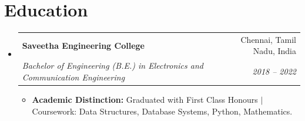 \documentclass[letterpaper,10pt]{article}
\makeatletter
\newcommand{\resumeItem}[1]{
  \item\small{
    {#1 \vspace{-2.5pt}}
  }
}
\newcommand{\resumeSubheading}[4]{
  \vspace{-2pt}\item
    \begin{tabular*}{1.0\textwidth}[t]{l@{\extracolsep{\fill}}r}
      \textbf{#1} & \small #2 \\
      \textit{\small#3} & \textit{\small #4} \\
    \end{tabular*}\vspace{-5pt}
}
\newcommand{\resumeSubHeadingListStart}{\begin{itemize}[leftmargin=0.0in, label={}]}
\newcommand{\resumeSubHeadingListEnd}{\end{itemize}\vspace{-4pt}}
\newcommand{\resumeItemListStart}{\begin{itemize}[leftmargin=0.15in, label={\tiny$\bullet$}]}
\newcommand{\resumeItemListEnd}{\end{itemize}\vspace{-4pt}}
\makeatother
\begin{document}
\section{Education}
\resumeSubHeadingListStart
  \resumeSubheading
    {Saveetha Engineering College}{Chennai, Tamil Nadu, India}
    {Bachelor of Engineering (B.E.) in Electronics and Communication Engineering}{2018 -- 2022}
    \resumeItemListStart
      \resumeItem{\textbf{Academic Distinction:} Graduated with First Class Honours $\vert$ Coursework: Data Structures, Database Systems, Python, Mathematics.}
    \resumeItemListEnd
\resumeSubHeadingListEnd
\end{document}

